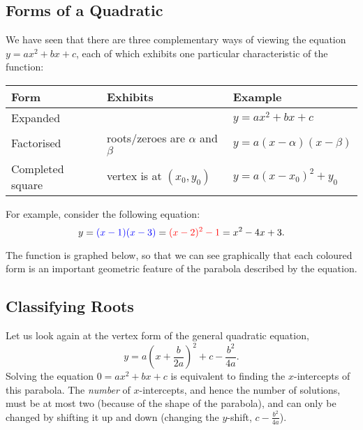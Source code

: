 \subsection*{Forms of a Quadratic}
We have seen that there are three complementary ways of viewing the equation $ y = ax^2 + bx + c $, each of which
exhibits one particular characteristic of the function:
\begin{center}
  \begin{tabular}{l|l|l}
    \textbf{Form} & \textbf{Exhibits} & \textbf{Example}\\\hline
    Expanded &  & $ y = ax^2 + bx + c $ \\
    Factorised & roots/zeroes are $ \alpha $ and $ \beta $ & $ y = a(x - \alpha)(x - \beta)$ \\
    Completed square & vertex is at $ (x_0, y_0) $ & $ y = a(x - x_0)^2 + y_0 $
  \end{tabular}
\end{center}

For example, consider the following equation:
\begin{displaymath}
  y = {\color{blue}(x - 1)(x - 3)} = {\color{red}(x - 2)^2 - 1} = x^2 - 4x + 3.
\end{displaymath}

The function is graphed below, so that we can see graphically that each coloured form is
an important geometric feature of the parabola described by the equation.

\begin{center}
\end{center}

\subsection*{Classifying Roots}
Let us look again at the vertex form of the general quadratic equation,
\begin{displaymath}
  y = a\left(x + \frac{b}{2a}\right)^2 + c - \frac{b^2}{4a}.
\end{displaymath}
Solving the equation $ 0 = ax^2 + bx + c $ is equivalent to finding the $ x$-intercepts of this parabola. The \emph{number} of $ x$-intercepts,
and hence the number of solutions, must be at most two (because of the shape of the parabola), and can only be changed by shifting it up and
down (changing the $ y$-shift, $ c - \frac{b^2}{4a} $).

